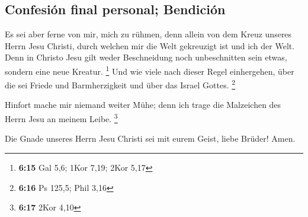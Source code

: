 \hypertarget{confesiuxf3n-final-personal-bendiciuxf3n}{%
\subsection{Confesión final personal;
Bendición}\label{confesiuxf3n-final-personal-bendiciuxf3n}}

 Es sei aber ferne von mir, mich zu rühmen, denn allein
von dem Kreuz unseres Herrn Jesu Christi, durch welchen mir die Welt
gekreuzigt ist und ich der Welt.  Denn in Christo Jesu
gilt weder Beschneidung noch unbeschnitten sein etwas, sondern eine neue
Kreatur. \footnote{\textbf{6:15} Gal 5,6; 1Kor 7,19; 2Kor 5,17}
 Und wie viele nach dieser Regel einhergehen, über die
sei Friede und Barmherzigkeit und über das Israel Gottes. \footnote{\textbf{6:16}
  Ps 125,5; Phil 3,16}

 Hinfort mache mir niemand weiter Mühe; denn ich trage
die Malzeichen des Herrn Jesu an meinem Leibe. \footnote{\textbf{6:17}
  2Kor 4,10}

 Die Gnade unseres Herrn Jesu Christi sei mit eurem
Geist, liebe Brüder! Amen.
